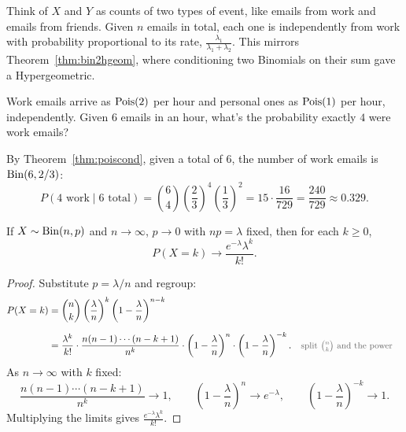 \bigskip

\begin{intuition}
Think of $X$ and $Y$ as counts of two types of event, like emails from work and emails from friends. Given $n$ emails in total, each one is independently from work with probability proportional to its rate, $\frac{\lambda_1}{\lambda_1 + \lambda_2}$. This mirrors Theorem~\ref{thm:bin2hgeom}, where conditioning two Binomials on their sum gave a Hypergeometric.
\end{intuition}

\bigskip

\begin{example}
Work emails arrive as $\operatorname{Pois}(2)$ per hour and personal ones as $\operatorname{Pois}(1)$ per hour, independently. Given $6$ emails in an hour, what's the probability exactly $4$ were work emails?
\end{example}

\medskip

\begin{solution}
By Theorem~\ref{thm:poiscond}, given a total of $6$, the number of work emails is $\operatorname{Bin}(6, 2/3)$:
\medskip
\[
P(\text{4 work} \mid \text{6 total}) = \binom{6}{4}\left(\frac{2}{3}\right)^{4}\left(\frac{1}{3}\right)^{2} = 15 \cdot \frac{16}{729} = \frac{240}{729} \approx 0.329.
\]
\end{solution}

\bigskip

\begin{theorem}\label{thm:poisapprox}
If $X \sim \operatorname{Bin}(n, p)$ and $n \to \infty$, $p \to 0$ with $np = \lambda$ fixed, then for each $k \ge 0$,
\medskip
\[
P(X = k) \to \frac{e^{-\lambda}\lambda^{k}}{k!}.
\]
\end{theorem}

\medskip

\begin{proof}
Substitute $p = \lambda/n$ and regroup:
\medskip
\begin{align*}
P(X = k)
  &= \binom{n}{k} \left(\frac{\lambda}{n}\right)^{k} \left(1 - \frac{\lambda}{n}\right)^{n-k} \\[0.6em]
  &= \frac{\lambda^{k}}{k!} \cdot \frac{n(n-1)\cdots(n-k+1)}{n^{k}} \cdot \left(1 - \frac{\lambda}{n}\right)^{n} \cdot \left(1 - \frac{\lambda}{n}\right)^{-k}.
  && \by{split $\tbinom{n}{k}$ and the power}
\end{align*}
\medskip
As $n \to \infty$ with $k$ fixed:
\medskip
\[
\frac{n(n-1)\cdots(n-k+1)}{n^{k}} \to 1,
\qquad
\left(1 - \frac{\lambda}{n}\right)^{n} \to e^{-\lambda},
\qquad
\left(1 - \frac{\lambda}{n}\right)^{-k} \to 1.
\]
\medskip
Multiplying the limits gives $\frac{e^{-\lambda}\lambda^{k}}{k!}$.
\end{proof}

